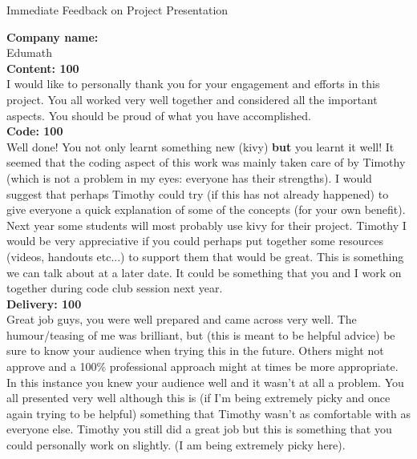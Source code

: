 \documentclass{article}
\begin{document}
\begin{center}
\Huge{Immediate Feedback on Project Presentation}\\
\end{center}


\normalsize
\textbf{Company name:}\\

Edumath \\

\textbf{Content: 100}\\

I would like to personally thank you for your engagement and efforts in this project.
You all worked very well together and considered all the important aspects.
You should be proud of what you have accomplished.\\

\textbf{Code: 100}\\

Well done!
You not only learnt something new (kivy) \textbf{but} you learnt it well!
It seemed that the coding aspect of this work was mainly taken care of by Timothy (which is not a problem in my eyes: everyone has their strengths).
I would suggest that perhaps Timothy could try (if this has not already happened) to give everyone a quick explanation of some of the concepts (for your own benefit).\\

Next year some students will most probably use kivy for their project.
Timothy I would be very appreciative if you could perhaps put together some resources (videos, handouts etc...) to support them that would be great.
This is something we can talk about at a later date.
It could be something that you and I work on together during code club session next year.\\

\textbf{Delivery: 100}\\

Great job guys, you were well prepared and came across very well.
The humour/teasing of me was brilliant, but (this is meant to be helpful advice) be sure to know your audience when trying this in the future.
Others might not approve and a 100\% professional approach might at times be more appropriate.
In this instance you knew your audience well and it wasn't at all a problem.
You all presented very well although this is (if I'm being extremely picky and once again trying to be helpful) something that Timothy wasn't as comfortable with as everyone else.
Timothy you still did a great job but this is something that you could personally work on slightly. (I am being extremely picky here).\\
\end{document}
